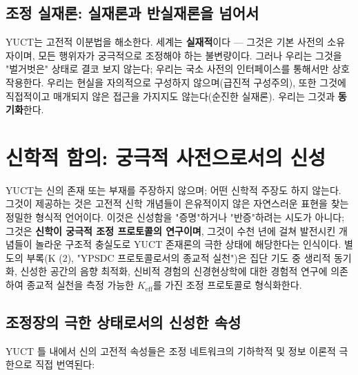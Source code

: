 \documentclass[12pt,a4paper]{article}
\begin{document}
	\subsection{조정 실재론: 실재론과 반실재론을 넘어서}
	
	YUCT는 고전적 이분법을 해소한다. 세계는 \textbf{실재적}이다 — 그것은 기본 사전의 소유자이며, 모든 행위자가 궁극적으로 조정해야 하는 불변량이다. 그러나 우리는 그것을 "벌거벗은" 상태로 결코 보지 않는다; 우리는 국소 사전의 인터페이스를 통해서만 상호작용한다. 우리는 현실을 자의적으로 구성하지 않으며(급진적 구성주의), 또한 그것에 직접적이고 매개되지 않은 접근을 가지지도 않는다(순진한 실재론). 우리는 그것과 \textbf{동기화}한다.
	
	\section{신학적 함의: 궁극적 사전으로서의 신성}
	\label{sec:theology}
	
	YUCT는 신의 존재 또는 부재를 주장하지 않으며; 어떤 신학적 주장도 하지 않는다. 그것이 제공하는 것은 고전적 신학 개념들이 은유적이지 않은 자연스러운 표현을 찾는 정밀한 형식적 언어이다. 이것은 신성함을 "증명"하거나 "반증"하려는 시도가 아니다; 그것은 \textbf{신학이 궁극적 조정 프로토콜의 연구이며}, 그것이 수천 년에 걸쳐 발전시킨 개념들이 놀라운 구조적 충실도로 YUCT 존재론의 극한 상태에 해당한다는 인식이다. 별도의 부록(K (2), "YPSDC 프로토콜로서의 종교적 실천")은 집단 기도 중 생리적 동기화, 신성한 공간의 음향 최적화, 신비적 경험의 신경현상학에 대한 경험적 연구에 의존하여 종교적 실천을 측정 가능한 \(K_{\mathrm{eff}}\)를 가진 조정 프로토콜로 형식화한다.
	
	\subsection{조정장의 극한 상태로서의 신성한 속성}
	
	YUCT 틀 내에서 신의 고전적 속성들은 조정 네트워크의 기하학적 및 정보 이론적 극한으로 직접 번역된다:
	
\end{document}
